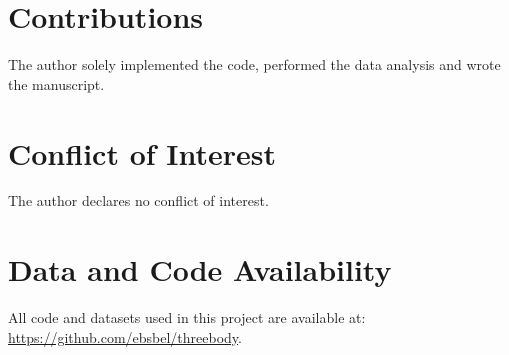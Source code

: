 \documentclass[%
 reprint,
 amsmath,amssymb,
 aps,
]{revtex4-2}
\begin{document}
\section{\label{sec:Contribution}Contributions} %

The author solely implemented the code, performed the data analysis and wrote the manuscript.


\section{\label{sec:COI}Conflict of Interest} %

The author declares no conflict of interest.


\section{\label{sec:datacode}Data and Code Availability} %

All code and datasets used in this project are available at: \href{https://github.com/ebsbel/threebody}{https://github.com/ebsbel/threebody}.



\end{document}
